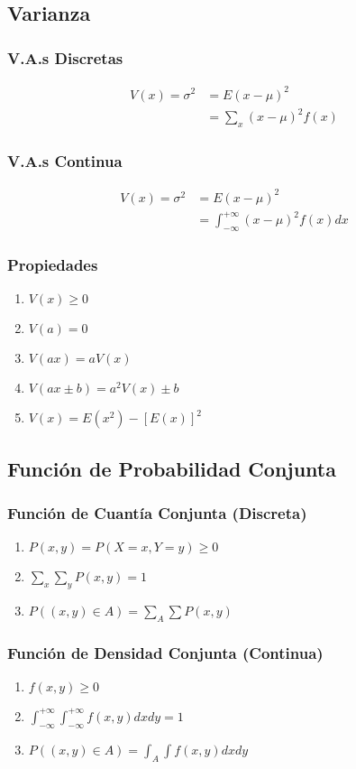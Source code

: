 \documentclass[10pt,letterpaper]{article}
\begin{document}
\subsection{Varianza}
\begin{multicols}{3}
\subsubsection{V.A.s Discretas}
\begin{align*}
V(x)=\sigma^2 &=  E(x-\mu)^2 \\
& = \displaystyle\sum_x (x-\mu)^2 f(x) 
\end{align*}
\columnbreak
\subsubsection{V.A.s Continua}
\begin{align*}
V(x)=\sigma^2 &=  E(x-\mu)^2 \\
& = \displaystyle\int_{-\infty}^{+\infty} (x-\mu)^2 f(x) dx
\end{align*}
\columnbreak
\subsubsection{Propiedades}
\begin{enumerate}
\item $V(x)\geq 0$
\item $V(a)=0$
\item $V(ax)=aV(x)$
\item $V(ax\pm b)=a^2 V(x)\pm b$
\item $V(x)=E(x^2)-[E(x)]^2$
\end{enumerate}
\end{multicols}
\subsection{Función de Probabilidad Conjunta}
\begin{multicols}{2}
\subsubsection{Función de Cuantía Conjunta (Discreta)}
\begin{enumerate}
\item $P(x,y)=P(X=x,Y=y)\geq 0$
\item $\displaystyle\sum_x \displaystyle\sum_y P(x,y)=1$
\item $P((x,y)\in A) = \sum_A \sum P(x,y)$
\end{enumerate}
\columnbreak
\subsubsection{Función de Densidad Conjunta (Continua)}
\begin{enumerate}
\item $f(x,y)\geq 0$
\item $\displaystyle\int_{-\infty}^{+\infty}\int_{-\infty}^{+\infty} f(x,y) dxdy = 1$
\item $P((x,y)\in A)=\displaystyle\int_A \int f(x,y) dxdy$
\end{enumerate}
\end{multicols}
\end{document}
